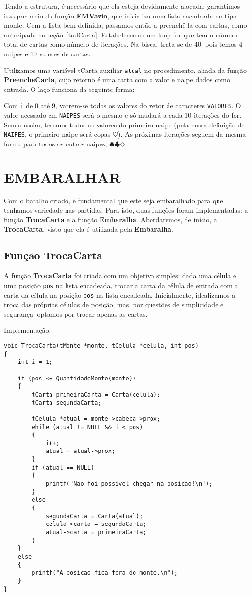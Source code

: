 \documentclass[12pt, oneside, a4paper, brazil]{abntex2}
\begin{document}
Tendo a estrutura, é necessário que ela esteja devidamente alocada; garantimos isso por meio da função \textbf{FMVazio}, que inicializa uma lista encadeada do tipo monte. Com a lista bem definida, passamos então a preenchê-la com cartas, como antecipado na seção~\ref{tadCarta}. Estabelecemos um loop for que tem o número total de cartas como número de iterações. Na bisca, trata-se de 40, pois temos 4 naipes e 10 valores de cartas. 

Utilizamos uma variável tCarta auxiliar \texttt{atual} no procedimento, aliada da função \textbf{PreencheCarta}, cujo retorno é uma carta com o valor e naipe dados como entrada. O laço funciona da seguinte forma:

Com \texttt{i} de 0 até 9, varrem-se todos os valores do vetor de caracteres \texttt{VALORES}. O valor acessado em \texttt{NAIPES} será o mesmo e só mudará a cada 10 iterações do for. Sendo assim, teremos todos os valores do primeiro naipe (pela nossa definição de \texttt{NAIPES}, o primeiro naipe será copas $\heartsuit$). As próximas iterações seguem da mesma forma para todos os outros naipes, $\spadesuit \clubsuit \diamondsuit$.

\section{EMBARALHAR}\label{se:implementaçãoEmbaralha}
Com o baralho criado, é fundamental que este seja embaralhado para que tenhamos variedade nas partidas. Para isto, duas funções foram implementadas: a função \textbf{TrocaCarta} e a função \textbf{Embaralha}.
Abordaremos, de início, a \textbf{TrocaCarta}, visto que ela é utilizada pela \textbf{Embaralha}.

\subsection{Função TrocaCarta}
A função \textbf{TrocaCarta} foi criada com um objetivo simples: dada uma célula e uma posição \texttt{pos} na lista encadeada, trocar a carta da célula de entrada com a carta da célula na posição \texttt{pos} na lista encadeada. Inicialmente, idealizamos a troca das próprias células de posição, mas, por questões de simplicidade e segurança, optamos por trocar apenas as cartas.

Implementação:

\begin{lstlisting}
void TrocaCarta(tMonte *monte, tCelula *celula, int pos)
{
    int i = 1;

    if (pos <= QuantidadeMonte(monte))
    {
        tCarta primeiraCarta = Carta(celula);
        tCarta segundaCarta;

        tCelula *atual = monte->cabeca->prox;
        while (atual != NULL && i < pos)
        {
            i++;
            atual = atual->prox;
        }
        if (atual == NULL)
        {
            printf("Nao foi possivel chegar na posicao!\n");
        }
        else
        {
            segundaCarta = Carta(atual);
            celula->carta = segundaCarta;
            atual->carta = primeiraCarta;
        }
    }
    else
    {
        printf("A posicao fica fora do monte.\n");
    }
}
\end{lstlisting}
\end{document}

